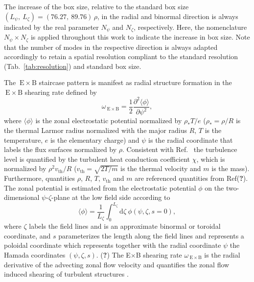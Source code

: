 \documentclass[aip, amsmath, amssymb, reprint, twocolumn]{revtex4-1}
\newcommand{\wexb}{\omega_{\mathrm{\:E \times B}}}
\newcommand{\exb}{\mathrm{\:E}\times\mathrm{B}}
\newcommand{\NR}{N_\psi}
\newcommand{\NB}{N_\zeta}
\newcommand{\rhoth}{\rho}
\newcommand{\vth}{v_{\mathrm{th}}}
\begin{document}
The increase of the box size, relative to the standard box size $(L_\psi,~L_\zeta) = (76.27,~89.76)\,\rhoth$, in the radial and binormal direction is always indicated by the real parameter $\NR$ and $\NB$, respectively.
Here, the nomenclature $\NR\times \NB$ is applied throughout this work to indicate the increase in box size.  
Note that the number of modes in the respective direction is always adapted accordingly to retain a spatial resolution compliant to the standard resolution (Tab.~\ref{tab:resolution}) and standard box size. \bigskip

The $\exb$ staircase pattern is manifest as radial structure formation in the $\exb$ shearing rate defined by\cite{rath2016, doi:10.1063/1.3005380, rath2016, peeters2016}
\begin{equation}
	\wexb = \frac{1}{2} \frac{\partial^2 \langle \phi \rangle}{\partial \psi^2},
	\label{eq:shearingrate}
\end{equation}
where $\langle \phi \rangle$ is the zonal electrostatic potential normalized by $\rho_\ast T/e$ ($\rho_\ast = \rhoth/R$ is the thermal Larmor radius normalized with the major radius $R$, $T$ is the temperature, $e$ is the elementary charge) and $\psi$ is the radial coordinate that labels the flux surfaces normalized by $\rhoth$. Consistent with Ref.~\cite{peeters2016} the turbulence level is quantified by the turbulent heat conduction coefficient $\chi$, which is normalized by $\rhoth^2 \vth/R$ ($\vth = \sqrt{2 T/m}$ is the thermal velocity and $m$ is the mass). Furthermore, quantities $\rhoth$, $R$, $T$, $\vth$ and $m$ are referenced quantities from Ref(\textbf{?}).
The zonal potential is estimated from the electrostatic potential $\phi$ on the two-dimensional $\psi$-$\zeta$-plane at the low field side according to
\begin{equation}
\langle \phi \rangle = \frac{1}{L_\zeta} \int_0^{L_\zeta} \mathrm{d}\zeta ~ \phi(\psi,\zeta,s=0),
\end{equation}
where $\zeta$ labels the field lines and is an approximate binormal or toroidal coordinate, and $s$ parameterizes the length along the field lines and represents a poloidal coordinate which represents together with the radial coordinate $\psi$ the Hamada coordinates $(\psi,\zeta,s)$. \cite{rath2021}(\textbf{?})
The E$\times$B shearing rate $\wexb$ is the radial derivative of the advecting zonal flow velocity \cite{doi:10.1063/1.871313, doi:10.1063/1.872847} and quantifies the zonal flow induced shearing of turbulent structures \cite{doi:10.1063/1.859529, doi:10.1063/1.871313, doi:10.1063/1.872367}.
\end{document}
